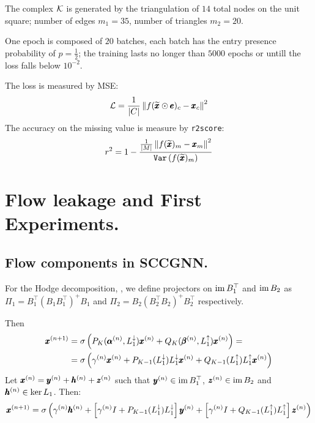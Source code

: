 \documentclass{mynotes}
\begin{document}
The complex \( \mathcal{K} \) is generated by the triangulation of \( 14 \) total nodes on the unit square; number of edges \( m_1 = 35\), number of triangles \( m_2 = 20 \). 

One epoch is composed of \( 20 \) batches, each batch has the entry presence probability of \( p = \frac{ 1 }{ 2 } \); the training lasts no longer than \( 5000 \) epochs or untill the loss falls below \( 10^{-2} \).

The loss is measured by MSE:
\begin{equation}
      \mathcal{L} = \frac{1}{ | C | } \left\| f( \widetilde{\pmb{x}} \odot \pmb{e} )_c - \pmb{x}_c \right\|^2 
\end{equation}
The accuracy on the missing value is measure by \texttt{r2score}:
\begin{equation}
      r^2 = 1 - \frac{ \frac{1}{|M|}  \left\| f( \widetilde{\pmb{x}} )_m - \pmb{x}_m \right\|^2   }{ \texttt{Var} \left( f( \widetilde{\pmb{x}} )_m \right) }
\end{equation}



\section{ Flow leakage and First Experiments. } 

\subsection{ Flow components in SCCGNN. }

For the Hodge decomposition, , we define projectors on \( \operatorname{im} B_1^\top \) and \( \operatorname{im} B_2 \) as \( \Pi_1 = B_1^\top \left( B_1 B_1^\top \right)^+ B_1 \) and \( \Pi_2 = B_2 \left( B_2^\top B_2 \right)^+ B_2^\top  \) respectively.

Then 
\begin{equation}
      \begin{aligned}
            \pmb{x}^{(n+1)} & =  \sigma \left( P_K( \pmb{\alpha}^{(n)}, L_{1}^{\downarrow}) \pmb{x}^{(n)} + Q_K( \pmb{\beta}^{(n)}, L_{1}^{\uparrow}) \pmb{x}^{(n)}  \right) = \\
            & = \sigma \left( \gamma^{(n)} \pmb{x}^{(n)} + P_{K-1}(L_{1}^{\downarrow})  L_{1}^{\downarrow} \pmb{x}^{(n)} +Q_{K-1} (L_{1}^{\uparrow})  L_{1}^{\uparrow}  \pmb{x}^{(n)} \right)
      \end{aligned}
\end{equation}
Let \( \pmb{x}^{(n)} = \pmb{y}^{(n)} + \pmb{h}^{(n)} + \pmb{z}^{(n)}\) such that \( \pmb{y}^{(n)} \in \operatorname{im} B_1^\top \), \( \pmb{z}^{(n)} \in \operatorname{im} B_2 \) and \( \pmb{h}^{(n)} \in \ker L_1 \). Then:
\begin{equation}
      \pmb{x}^{(n+1)} = \sigma \left( \gamma^{(n)} \pmb{h}^{(n)} + \left[ \gamma^{(n)} I + P_{K-1}(L_{1}^{\downarrow}) L_{1}^{\downarrow}  \right]  \pmb{y}^{(n)} + \left[ \gamma^{(n)} I + Q_{K-1}(L_{1}^{\uparrow}) L_{1}^{\uparrow}  \right]  \pmb{z}^{(n)} \right)
\end{equation}
\end{document}
